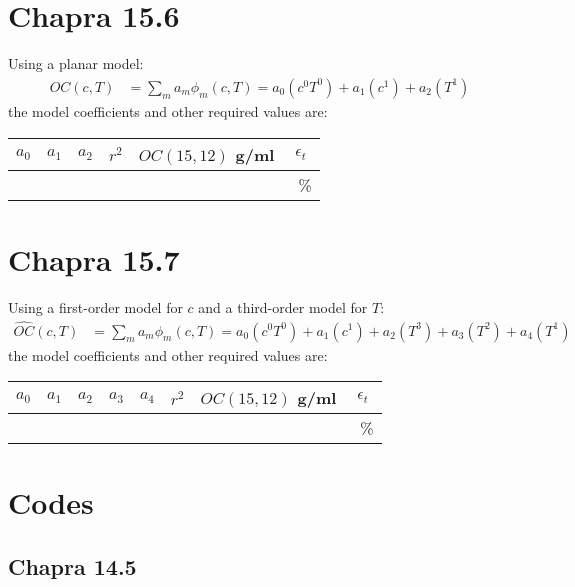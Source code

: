 \documentclass{article}
\begin{document}
\section{Chapra 15.6}
Using a planar model:
\begin{align*}
\hat{OC}(c, T)&=\sum_ma_m\phi_m(c, T)=a_0(c^0T^0)+a_1(c^1)+a_2(T^1)
\end{align*}
the model coefficients and other required values are:
\begin{center}
\begin{tabular}{c|c|c|c|c|c}
$a_0$ & $a_1$ & $a_2$ & $r^2$ & $OC(15, 12)$ g/ml & $\epsilon_t$ \\ \hline
~ & ~ & ~ & ~ & ~ & ~\%
\end{tabular}
\end{center}


\section{Chapra 15.7}
Using a first-order model for $c$ and a third-order model for $T$:
\begin{align*}
\hat{OC}(c, T)&=
\sum_ma_m\phi_m(c, T)=a_0(c^0T^0)+a_1(c^1)+a_2(T^3)+a_3(T^2)+a_4(T^1) 
\end{align*}
the model coefficients and other required values are:
\begin{center}
\begin{tabular}{c|c|c|c|c|c|c|c}
$a_0$ & $a_1$ & $a_2$ & $a_3$ & $a_4$ & $r^2$ & $OC(15, 12)$ g/ml & $\epsilon_t$ \\ \hline
~ & ~ & ~ & ~ & ~ & ~ & ~ & ~\%
\end{tabular}
\end{center}


\pagebreak
\appendix
\section{Codes}
\lstset{style=python103, language=python} 

\subsection{Chapra 14.5}
\pagebreak
\end{document}
